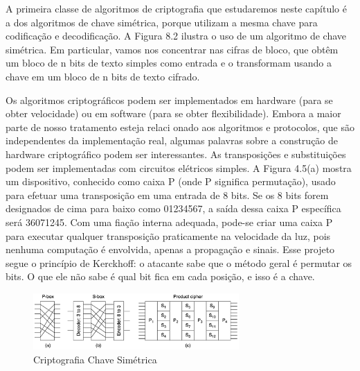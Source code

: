 A primeira classe de algoritmos de criptografia que estudaremos neste capítulo é a dos algoritmos
de chave simétrica, porque utilizam a mesma chave para codificação e decodificação. A Figura
8.2 ilustra o uso de um algoritmo de chave simétrica. Em particular, vamos nos concentrar nas
cifras de bloco, que obtêm um bloco de n bits de texto simples como entrada e o transformam
usando a chave em um bloco de n bits de texto cifrado.

Os algoritmos criptográficos podem ser implementados em hardware (para se obter velocidade) ou
em software (para se obter flexibilidade). Embora a maior parte de nosso tratamento esteja relaci
onado aos algoritmos e protocolos, que são independentes da implementação real, algumas
palavras sobre a construção de hardware criptográfico podem ser interessantes. As transposições e
substituições podem ser implementadas com circuitos elétricos simples. A Figura 4.5(a) mostra um
dispositivo, conhecido como caixa P (onde P significa permutação), usado para efetuar uma
transposição em uma entrada de 8 bits. Se os 8 bits forem designados de cima para baixo como
01234567, a saída dessa caixa P específica será 36071245. Com uma fiação interna adequada,
pode-se criar uma caixa P para executar qualquer transposição praticamente na velocidade da luz,
pois nenhuma computação é envolvida, apenas a propagação e sinais. Esse projeto segue o
princípio de Kerckhoff: o atacante sabe que o método geral é permutar os bits. O que ele não sabe
é qual bit fica em cada posição, e isso é a chave.


\begin{figure}
	\begin{center}
		\includegraphics[width=0.7\textwidth]{criptografia6}
	\end{center}
	\caption{Criptografia Chave Simétrica \cite{tanenbaum}}
	\label{fig:criptografia6}
\end{figure}


